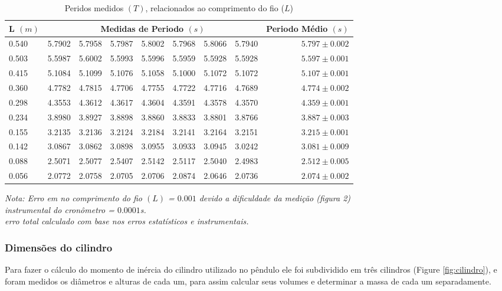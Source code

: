 \documentclass[12pt,a4paper]{article}
\begin{document}
\begin{table}[!htbp]
\def\arraystretch{1.3}
\caption{Peridos medidos $(T)$, relacionados ao comprimento do fio ($L$)} 
\label{Resultados}
\begin{tabular}{|l|ccccccc|r|}
\hline 
L $(m)$ & \multicolumn{7}{c|}{Medidas de Periodo $(s)$} & Periodo Médio $(s)$ \\ 
\hline 
0.540 & 5.7902 & 5.7958 & 5.7987 & 5.8002 & 5.7968 & 5.8066 & 5.7940 & $5.797 \pm 0.002$\\
\hline 
0.503 & 5.5987 & 5.6002 & 5.5993 & 5.5996 & 5.5959 & 5.5928 & 5.5928 &$ 5.597 \pm 0.001$\\
\hline 
0.415 & 5.1084 & 5.1099 & 5.1076 & 5.1058 & 5.1000 & 5.1072 & 5.1072 & $5.107 \pm 0.001$\\
\hline 
0.360 & 4.7782 & 4.7815 & 4.7706 & 4.7755 & 4.7722 & 4.7716 & 4.7689 & $4.774 \pm 0.002$\\
\hline 
0.298 & 4.3553 & 4.3612 & 4.3617 & 4.3604 & 4.3591 & 4.3578 & 4.3570 & $4.359 \pm 0.001$\\
\hline 
0.234 & 3.8980 & 3.8927 & 3.8898 & 3.8860 & 3.8833 & 3.8801 & 3.8766 & $3.887 \pm 0.003$\\
\hline 
0.155 & 3.2135 & 3.2136 & 3.2124 & 3.2184 & 3.2141 & 3.2164 & 3.2151 & $3.215 \pm 0.001$\\
\hline 
0.142 & 3.0867 & 3.0862 & 3.0898 & 3.0955 & 3.0933 & 3.0945 & 3.0242 & $3.081 \pm 0.009$\\
\hline 
0.088 & 2.5071 & 2.5077 & 2.5407 & 2.5142 & 2.5117 & 2.5040 & 2.4983 & $2.512 \pm 0.005$\\
\hline 
0.056 & 2.0772 & 2.0758 & 2.0705 & 2.0706 & 2.0874 & 2.0646 & 2.0736 & $2.074 \pm 0.002$\\
\hline
\end{tabular} 
\emph{Nota: Erro em no comprimento do fio $(L)$ = $0.001$ devido a dificuldade da medição (figura 2) \\ instrumental do cronômetro = $0.0001$s.\\ erro total calculado com base nos erros estatísticos e instrumentais.}

\end{table}


\subsubsection{Dimensões do cilindro}
Para fazer o cálculo do momento de inércia do cilindro utilizado no pêndulo ele foi subdividido em três cilindros (Figure \ref{fig:cilindro}), e foram medidos os diâmetros e alturas de cada um, para assim calcular seus volumes e determinar a massa de cada um separadamente.
\end{document}
